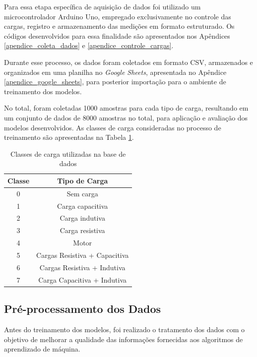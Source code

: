 Para essa etapa específica de aquisição de dados foi utilizado um microcontrolador Arduino Uno, empregado exclusivamente no controle das cargas, registro e armazenamento das medições em formato estruturado. Os códigos desenvolvidos para essa finalidade são apresentados nos Apêndices \ref{apendice_coleta_dados} e \ref{apendice_controle_cargas}.

Durante esse processo, os dados foram coletados em formato CSV, armazenados e organizados em uma planilha no \textit{Google Sheets}, apresentada no Apêndice \ref{apendice_google_sheets}, para posterior importação para o ambiente de treinamento dos modelos.

No total, foram coletadas 1000 amostras para cada tipo de carga, resultando em um conjunto de dados de 8000 amostras no total, para aplicação e avaliação dos modelos desenvolvidos. As classes de carga consideradas no processo de treinamento são apresentadas na Tabela \ref{tab_classes_carga}.

\begin{table}[!htbp]
    \centering
    \caption{Classes de carga utilizadas na base de dados}
    \label{tab_classes_carga}
    \begin{tabular}{|c|c|}
    \hline
    \textbf{Classe} & \textbf{Tipo de Carga} \\
    \hline
    0 & Sem carga \\
    \hline
    1 & Carga capacitiva \\
    \hline
    2 & Carga indutiva \\
    \hline
    3 & Carga resistiva \\
    \hline
    4 & Motor \\
    \hline
    5 & Cargas Resistiva + Capacitiva \\
    \hline
    6 & Cargas Resistiva + Indutiva \\
    \hline
    7 & Carga Capacitiva + Indutiva \\
    \hline
    \end{tabular}
\end{table}

\subsection{Pré-processamento dos Dados}

Antes do treinamento dos modelos, foi realizado o tratamento dos dados com o objetivo de melhorar a qualidade das informações fornecidas aos algoritmos de aprendizado de máquina.

